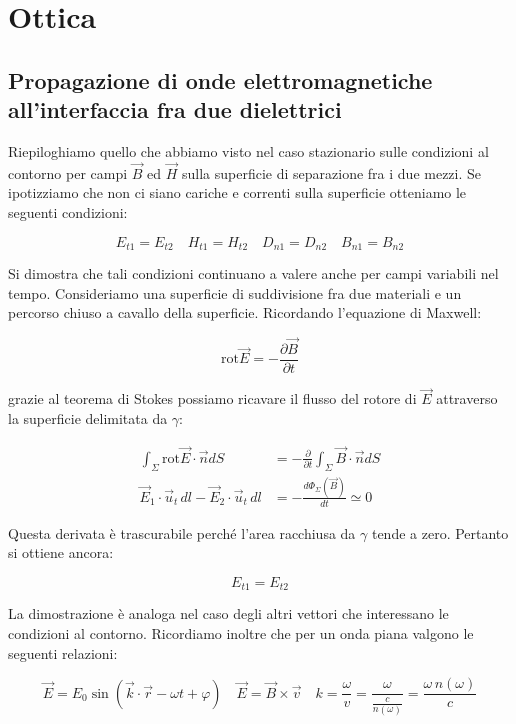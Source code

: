 \chapter{Ottica}

\section{Propagazione di onde elettromagnetiche all'interfaccia fra due dielettrici}

Riepiloghiamo quello che abbiamo visto nel caso stazionario sulle condizioni al contorno per campi $\vec{B}$ ed $\vec{H}$ sulla superficie di separazione fra i due mezzi.
Se ipotizziamo che non ci siano cariche e correnti sulla superficie otteniamo le seguenti condizioni:

\[
	E_{t1}=E_{t2} \quad H_{t1}=H_{t2} \quad D_{n1}=D_{n2} \quad B_{n1}=B_{n2}
\]

Si dimostra che tali condizioni continuano a valere anche per campi variabili nel tempo. Consideriamo una superficie di suddivisione fra due materiali e un percorso chiuso a cavallo della superficie. Ricordando l'equazione di Maxwell:

\[
	\text{rot}\vec{E} = - \frac{\partial \vec{B}}{\partial t}
\]

grazie al teorema di Stokes possiamo ricavare il flusso del rotore di $\vec{E}$ attraverso la superficie delimitata da $\gamma$:

\begin{align*}
	\int_{\Sigma}\text{rot}\vec{E} \cdot \vec{n} dS &= -\frac{\partial}{\partial t} \int_{\Sigma} \vec{B} \cdot \vec{n} dS \\
	\vec{E}_1\cdot \vec{u}_t \,dl - \vec{E}_2\cdot \vec{u}_t\,dl &= - \frac{d\Phi_{\Sigma} (\vec{B})}{dt} \simeq 0
\end{align*}

Questa derivata è trascurabile perché l'area racchiusa da $\gamma$ tende a zero. Pertanto si ottiene ancora:

\[
	E_{t1}=E_{t2}
\]

La dimostrazione è analoga nel caso degli altri vettori che interessano le condizioni al contorno. Ricordiamo inoltre che per un onda piana valgono le seguenti relazioni:

\[
	\vec{E} =E_0\sin (\vec{k} \cdot \vec{r} -\omega t + \varphi) \quad \vec{E} =\vec{B} \times \vec{v}  \quad k = \frac{\omega}{v}=\frac{\omega}{\frac{c}{n(\omega)}} = \frac{\omega\,n(\omega)}{c}
\]


